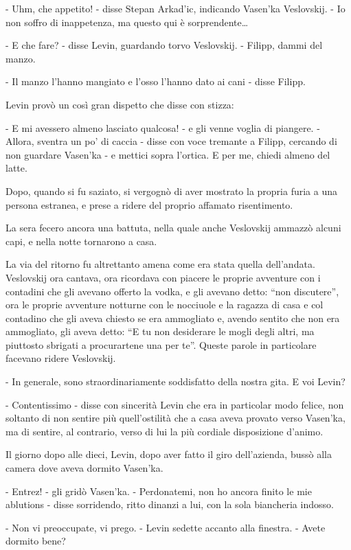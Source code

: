- Uhm, che appetito! - disse Stepan Arkad'ic, indicando Vasen'ka Veslovskij. - Io non soffro di inappetenza, ma questo qui è sorprendente\ldots{} 

- E che fare? - disse Levin, guardando torvo Veslovskij. - Filipp, dammi del manzo. 

- Il manzo l'hanno mangiato e l'osso l'hanno dato ai cani - disse Filipp. 

Levin provò un così gran dispetto che disse con stizza: 

- E mi avessero almeno lasciato qualcosa! - e gli venne voglia di piangere. - Allora, sventra un po' di caccia - disse con voce tremante a Filipp, cercando di non guardare Vasen'ka - e mettici sopra l'ortica. E per me, chiedi almeno del latte. 

Dopo, quando si fu saziato, si vergognò di aver mostrato la propria furia a una persona estranea, e prese a ridere del proprio affamato risentimento. 

La sera fecero ancora una battuta, nella quale anche Veslovskij ammazzò alcuni capi, e nella notte tornarono a casa. 

La via del ritorno fu altrettanto amena come era stata quella dell'andata. Veslovskij ora cantava, ora ricordava con piacere le proprie avventure con i contadini che gli avevano offerto la vodka, e gli avevano detto: ``non discutere'', ora le proprie avventure notturne con le nocciuole e la ragazza di casa e col contadino che gli aveva chiesto se era ammogliato e, avendo sentito che non era ammogliato, gli aveva detto: ``E tu non desiderare le mogli degli altri, ma piuttosto sbrigati a procurartene una per te''. Queste parole in particolare facevano ridere Veslovskij. 

- In generale, sono straordinariamente soddisfatto della nostra gita. E voi Levin? 

- Contentissimo - disse con sincerità Levin che era in particolar modo felice, non soltanto di non sentire più quell'ostilità che a casa aveva provato verso Vasen'ka, ma di sentire, al contrario, verso di lui la più cordiale disposizione d'animo. 

Il giorno dopo alle dieci, Levin, dopo aver fatto il giro dell'azienda, bussò alla camera dove aveva dormito Vasen'ka. 

- Entrez! - gli gridò Vasen'ka. - Perdonatemi, non ho ancora finito le mie ablutions - disse sorridendo, ritto dinanzi a lui, con la sola biancheria indosso. 

- Non vi preoccupate, vi prego. - Levin sedette accanto alla finestra. - Avete dormito bene? 

